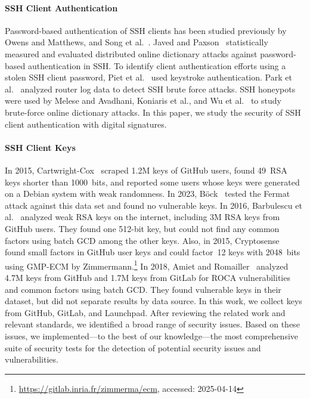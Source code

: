 \paragraph{SSH Client Authentication}

Password-based authentication of SSH clients has been studied previously by Owens and Matthews, and Song et al.~\cite{USENIX:SonWagTia01,owens2008study}. Javed and Paxson~\cite{CCS:JavPax13} statistically measured and evaluated distributed online dictionary attacks against password-based authentication in SSH. To identify client authentication efforts using a stolen SSH client password, Piet et al.~\cite{USENIX:PSPW23} used keystroke authentication. Park et al.~\cite{park2021network} analyzed router log data to detect SSH brute force attacks. SSH honeypots were used by Melese and Avadhani, Koniaris et al., and Wu et al.~\cite{6624967,melese2016honeypot,Wu2020MiningTI} to study brute-force online dictionary attacks. In this paper, we study the security of SSH client authentication with digital signatures.

\paragraph{SSH Client Keys}

In 2015, Cartwright-Cox~\cite{cox2015} scraped 1.2M keys of GitHub users, found 49~RSA keys shorter than 1000~bits, and reported some users whose keys were generated on a Debian system with weak randomness. In 2023, Böck~\cite{EPRINT:Bock23} tested the Fermat attack against this data set and found no vulnerable keys. In 2016, Barbulescu et al.~\cite{barbulescu2016weakrsakeys} analyzed weak RSA keys on the internet, including 3M RSA keys from GitHub users. They found one 512-bit key, but could not find any common factors using batch GCD among the other keys. Also, in 2015, Cryptosense~\cite{cryptosense2015} found small factors in GitHub user keys and could factor~12 keys with 2048~bits using GMP\nobreakdashes-ECM by Zimmermann.\footnote{\url{https://gitlab.inria.fr/zimmerma/ecm}, accessed: 2025-04-14} In 2018, Amiet and Romailler~\cite{amiet2018} analyzed 4.7M keys from GitHub and 1.7M keys from GitLab for ROCA vulnerabilities and common factors using batch GCD. They found vulnerable keys in their dataset, but did not separate results by data source. In this work, we collect keys from GitHub, GitLab, and Launchpad. After reviewing the related work and relevant standards, we identified a broad range of security issues. Based on these issues, we implemented---to the best of our knowledge---the most comprehensive suite of security tests for the detection of potential security issues and vulnerabilities.

